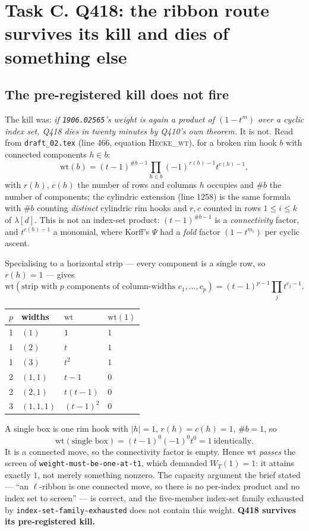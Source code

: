 \documentclass[11pt]{article}
\theoremstyle{definition}
\begin{document}
\section{Task C.  Q418: the ribbon route survives its kill and dies of something else}

\subsection{The pre-registered kill does not fire}

The kill was: \emph{if \texttt{1906.02565}'s weight is again a product of $(1-t^m)$ over
a cyclic index set, Q418 dies in twenty minutes by Q410's own theorem.}  It is not.
Read from \texttt{draft\_02.tex} (line 466, equation \textsc{Hecke\_wt}), for a broken
rim hook $b$ with connected components $h\in b$:
\[
  \mathrm{wt}(b)=(t-1)^{\#b-1}\prod_{h\in b}(-1)^{r(h)-1}t^{c(h)-1},
\]
with $r(h)$, $c(h)$ the number of rows and columns $h$ occupies and $\#b$ the number of
components; the cylindric extension (line 1258) is the same formula with $\#b$ counting
\emph{distinct} cylindric rim hooks and $r,c$ counted in rows $1\le i\le k$ of
$\lambda[d]$.  This is not an index-set product: $(t-1)^{\#b-1}$ is a
\emph{connectivity} factor, and $t^{c(h)-1}$ a monomial, where Korff's $\Psi$ had a
\emph{fold} factor $(1-t^{m_i})$ per cyclic ascent.

Specialising to a horizontal strip --- every component is a single row, so $r(h)=1$ ---
gives
\[
  \mathrm{wt}(\text{strip with } p \text{ components of column-widths } c_1,\dots,c_p)
  = (t-1)^{p-1}\prod_{j}t^{c_j-1}.
\]
\begin{center}\small
\begin{tabular}{@{}llll@{}}
\toprule
$p$ & widths & $\mathrm{wt}$ & $\mathrm{wt}(1)$\\
\midrule
1 & $(1)$ & $1$ & $1$\\
1 & $(2)$ & $t$ & $1$\\
1 & $(3)$ & $t^2$ & $1$\\
2 & $(1,1)$ & $t-1$ & $0$\\
2 & $(2,1)$ & $t(t-1)$ & $0$\\
3 & $(1,1,1)$ & $(t-1)^2$ & $0$\\
\bottomrule
\end{tabular}
\end{center}
A single box is one rim hook with $|h|=1$, $r(h)=c(h)=1$, $\#b=1$, so
\[
  \boxed{\ \mathrm{wt}(\text{single box})=(t-1)^0(-1)^0t^0=1\ \text{identically.}\ }
\]
It is a connected move, so the connectivity factor is empty.  Hence $\mathrm{wt}$
\emph{passes} the screen of \texttt{weight-must-be-one-at-t1}, which demanded
$W_T(1)=1$: it attains exactly $1$, not merely something nonzero.  The capacity argument
the brief stated --- ``an $\ell$-ribbon is one connected move, so there is no per-index
product and no index set to screen'' --- is correct, and the five-member index-set family
exhausted by \texttt{index-set-family-exhausted} does not contain this weight.
\textbf{Q418 survives its pre-registered kill.}
\end{document}
